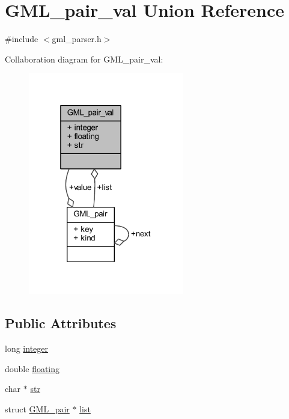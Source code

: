\hypertarget{union_g_m_l__pair__val}{}\section{G\+M\+L\+\_\+pair\+\_\+val Union Reference}
\label{union_g_m_l__pair__val}


{\ttfamily \#include $<$gml\+\_\+parser.\+h$>$}



Collaboration diagram for G\+M\+L\+\_\+pair\+\_\+val\+:\nopagebreak
\begin{figure}[H]
\begin{center}
\leavevmode
\includegraphics[width=193pt]{union_g_m_l__pair__val__coll__graph}
\end{center}
\end{figure}
\subsection*{Public Attributes}
\begin{DoxyCompactItemize}
\item 
long \mbox{\hyperlink{union_g_m_l__pair__val_a701b42178210e3460f15cc34bcd389ff}{integer}}
\item 
double \mbox{\hyperlink{union_g_m_l__pair__val_a83eecc4083fbf9dfe1608e027311df6c}{floating}}
\item 
char $\ast$ \mbox{\hyperlink{union_g_m_l__pair__val_a8d2623e5827be15b91bf98dbd668e371}{str}}
\item 
struct \mbox{\hyperlink{struct_g_m_l__pair}{G\+M\+L\+\_\+pair}} $\ast$ \mbox{\hyperlink{union_g_m_l__pair__val_ad9d038864154789007178fbf4d43ec9d}{list}}
\end{DoxyCompactItemize}


